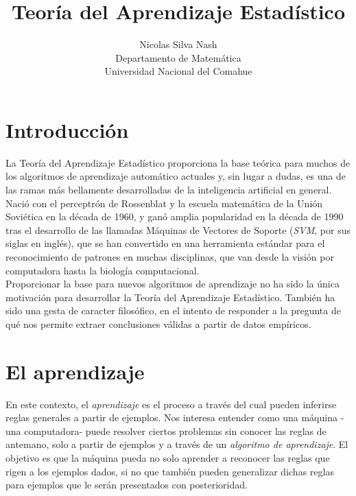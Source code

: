 \documentclass{article}
\begin{document}
\title{Teoría del Aprendizaje Estadístico}
\author{Nicolas Silva Nash \\ Departamento de Matemática \\ Universidad Nacional del Comahue}
\maketitle

\section{Introducción}
La Teoría del Aprendizaje Estadístico proporciona la base teórica para muchos de los algoritmos de aprendizaje automático actuales y,
sin lugar a dudas, es una de las ramas más bellamente desarrolladas de la inteligencia artificial en general. Nació con el perceptrón de Rossenblat
y la escuela matemática de la Unión Soviética en la década de 1960, y ganó amplia popularidad en la década de 1990 tras el desarrollo de las llamadas 
Máquinas de Vectores de Soporte (\textit{SVM}, por sus siglas en inglés), que se han convertido en una herramienta estándar para el reconocimiento de 
patrones en muchas disciplinas, que van desde la visión por computadora hasta la biología computacional.\\

Proporcionar la base para nuevos algoritmos de aprendizaje no ha sido la única motivación para desarrollar la Teoría del Aprendizaje 
Estadístico. También ha sido una gesta de caracter filosófico, en el intento de responder a la pregunta de qué nos permite extraer conclusiones válidas 
a partir de datos empíricos.  

\section{El aprendizaje}

En este contexto, el \textit{aprendizaje} es el proceso a través del cual pueden inferirse reglas generales a partir de ejemplos. Nos interesa 
entender como una máquina -una computadora- puede resolver ciertos problemas sin conocer las reglas de antemano, solo a partir de ejemplos y a través
de un \textit{algoritmo de aprendizaje}. El objetivo es que la máquina pueda no solo aprender a reconocer las reglas que rigen a los ejemplos dados,
si no que también pueden generalizar dichas reglas para ejemplos que le serán presentados con posterioridad.\\
\end{document}
